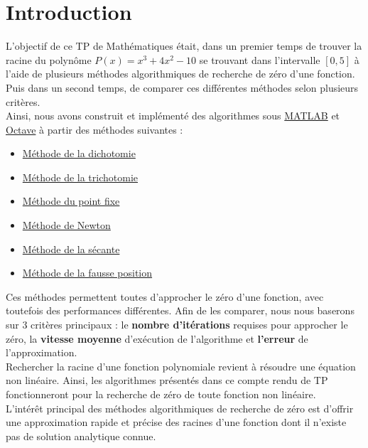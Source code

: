 \documentclass[12pt]{article}
\begin{document}
\section{Introduction}
\noindent L'objectif de ce TP de Mathématiques était, dans un premier temps de trouver la racine du polynôme $P(x) = x^3 + 4x^2 -10$ se trouvant dans l'intervalle $[0,5]$ à l'aide de plusieurs méthodes algorithmiques de recherche de zéro d'une fonction. Puis dans un second temps, de comparer ces différentes méthodes selon plusieurs critères.\\

\noindent Ainsi, nous avons construit et implémenté des algorithmes sous \href{https://www.mathworks.com/products/matlab.html}{MATLAB} et \href{https://octave.org/}{Octave} à partir des méthodes suivantes :
\begin{itemize}
    \item \hyperref[ref:dichotomie]{Méthode de la dichotomie}
    \item \hyperref[ref:trichotomie]{Méthode de la trichotomie}
    \item \hyperref[ref:pt-fixe]{Méthode du point fixe}
    \item \hyperref[ref:newton]{Méthode de Newton}
    \item \hyperref[ref:sécante]{Méthode de la sécante}
    \item \hyperref[ref:fausse-position]{Méthode de la fausse position}\\
\end{itemize}
\noindent Ces méthodes permettent toutes d'approcher le zéro d'une fonction, avec toutefois des performances différentes. Afin de les comparer, nous nous baserons sur 3 critères principaux : le \textbf{nombre d'itérations} requises pour approcher le zéro, la \textbf{vitesse moyenne} d'exécution de l'algorithme et \textbf{l'erreur} de l'approximation.\\

\noindent Rechercher la racine d'une fonction polynomiale revient à résoudre une équation non linéaire. Ainsi, les algorithmes présentés dans ce compte rendu de TP fonctionneront pour la recherche de zéro de toute fonction non linéaire.\\ 

\noindent L'intérêt principal des méthodes algorithmiques de recherche de zéro est d'offrir une approximation rapide et précise des racines d'une fonction dont il n'existe pas de solution analytique connue.\\
\end{document}
